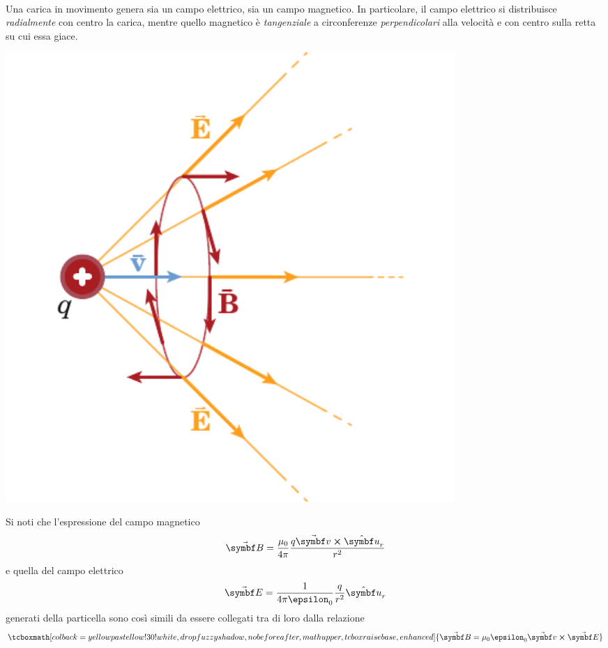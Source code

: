 \begin{observe}~\\
	\begin{minipage}{0.75\textwidth}
		Una carica in movimento genera sia un campo elettrico, sia un campo magnetico. In particolare, il campo elettrico si distribuisce \textit{radialmente} con centro la carica, mentre quello magnetico è \textit{tangenziale} a circonferenze \textit{perpendicolari} alla velocità e con centro sulla retta su cui essa giace.
	\end{minipage}\hspace{5pt}
	\begin{minipage}{0.24\textwidth}
			\begin{center}
			\includegraphics[width=0.75\textwidth]{images/chp8/chp8campomagneticoelettrico.pdf}
		\end{center}
	\end{minipage}
\end{observe}
Si noti che l'espressione del campo magnetico
\begin{equation*}
	\vba{B}=\frac{\mu_0}{4\pi}\frac{q\vba{v}\cross\vbh{u}_r}{r^2}
\end{equation*}
e quella del campo elettrico
\begin{equation*}
	\vba{E}=\frac{1}{4\pi\epsilon_0}\frac{q}{r^2}\vbh{u}_r
\end{equation*}
generati della particella sono così simili da essere collegati tra di loro dalla relazione
\begin{equation}
	\tcboxmath[colback=yellowpastellow!30!white,drop fuzzy shadow, nobeforeafter, math upper, tcbox raise base, enhanced]{\vba{B}=\mu_0\epsilon_0\vba{v}\cross\vba{E}}
\end{equation}
